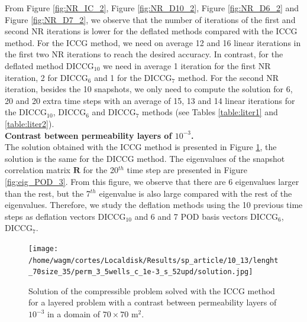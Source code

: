 \documentclass[12pt]{article}
\begin{document}
From Figure \ref{fig:NR_IC_2},  Figure \ref{fig:NR_D10_2}, Figure \ref{fig:NR_D6_2} and Figure \ref{fig:NR_D7_2}, we observe that the number of iterations of the first and second NR iterations is lower for the deflated methods compared with the ICCG method. For the ICCG method, we need on average 12 and 16 linear iterations in the first two NR iterations to reach the desired accuracy. In contrast, for the deflated method DICCG$_{10}$ we need in average 1 iteration for the first NR iteration, 2 for DICCG$_6$ and 1 for the DICCG$_7$ method. For the second NR iteration, besides the 10 snapshots, we only need to compute the solution for 6, 20 and 20 extra time steps with an average of 15, 13 and 14 linear iterations for the DICCG$_{10}$, DICCG$_6$ and DICCG$_7$ methods (see Tables \ref{table:liter1} and \ref{table:liter2}). \\

\newpage
\textbf{Contrast between permeability layers of $10^{-3}$.}\\
The solution obtained with the ICCG method is presented in Figure \ref{fig:compsol_3}, the solution is the same for the DICCG method. The eigenvalues of the snapshot correlation matrix $\mathbf{R}$ for the 20$^{th}$ time step are presented in Figure \ref{fig:eig_POD_3}. From this figure, we observe that there are 6 eigenvalues larger than the rest, but the 7$^{th}$ eigenvalue is also large compared with the rest of the eigenvalues. Therefore, we study the deflation methods using the 10 previous time steps as deflation vectors DICCG$_{10}$ and 6 and 7 POD basis vectors DICCG$_6$, DICCG$_7$.    


\begin{figure}[!h]
\centering
\begin{minipage}{.7\textwidth}
 \centering
\texttt{[image: /home/wagm/cortes/Localdisk/Results/sp\_article/10\_13/lenght\_70size\_35/perm\_3\_5wells\_c\_1e-3\_s\_52upd/solution.jpg]}
\caption{Solution of the compressible problem solved with the ICCG method for a layered problem with a contrast between permeability layers of $10^{-3}$ in a domain of $70 \times 70$ m$^2$.}
\label{fig:compsol_3}
\end{minipage}
\end{figure}
\end{document}
